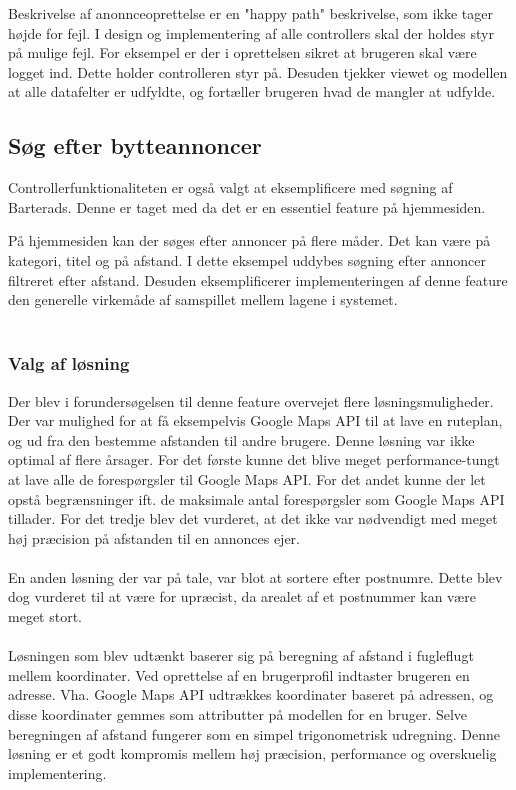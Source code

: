 \noindent Beskrivelse af anonnceoprettelse er en "happy path" beskrivelse, som ikke tager højde for fejl. I design og implementering af alle controllers skal der holdes styr på mulige fejl. For eksempel er der i oprettelsen sikret at brugeren skal være logget ind. Dette holder controlleren styr på. Desuden tjekker viewet og modellen at alle datafelter er udfyldte, og fortæller brugeren hvad de mangler at udfylde.

\subsection{Søg efter bytteannoncer}     
Controllerfunktionaliteten er også valgt at eksemplificere med søgning af Barterads. Denne er taget med da det er en essentiel feature på hjemmesiden.

På hjemmesiden kan der søges efter annoncer på flere måder. Det kan være på kategori, titel og på afstand. I dette eksempel uddybes søgning efter annoncer filtreret efter afstand. Desuden eksemplificerer implementeringen af denne feature den generelle virkemåde af samspillet mellem lagene i systemet.  \\ \\

\subsubsection{Valg af løsning}
Der blev i forundersøgelsen til denne feature overvejet flere løsningsmuligheder. Der var mulighed for at få eksempelvis Google Maps API\cite{googleapi} til at lave en ruteplan, og ud fra den bestemme afstanden til andre brugere. Denne løsning var ikke optimal af flere årsager. For det første kunne det blive meget performance-tungt at lave alle de forespørgsler til Google Maps API. For det andet kunne der let opstå begrænsninger ift. de maksimale antal forespørgsler som Google Maps API tillader. For det tredje blev det vurderet, at det ikke var nødvendigt med meget høj præcision på afstanden til en annonces ejer.  \\ \\

\noindent En anden løsning der var på tale, var blot at sortere efter postnumre. Dette blev dog vurderet til at være for upræcist, da arealet af et postnummer kan være meget stort. 
\\ \\

\noindent Løsningen som blev udtænkt baserer sig på beregning af afstand i fugleflugt mellem koordinater. Ved oprettelse af en brugerprofil indtaster brugeren en adresse. Vha. Google Maps API udtrækkes koordinater baseret på adressen, og disse koordinater gemmes som attributter på modellen for en bruger. Selve beregningen af afstand fungerer som en simpel trigonometrisk udregning. Denne løsning er et godt kompromis mellem høj præcision, performance og overskuelig implementering.

